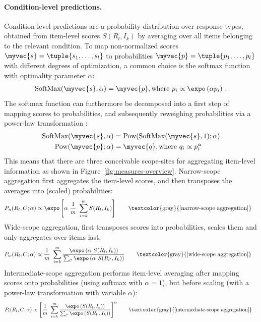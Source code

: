 \documentclass[fleqn]{article}
\begin{document}
\paragraph{Condition-level predictions.}
Condition-level predictions are a probability distribution over response types, obtained from item-level scores $S(R_{l}, I_{k})$ by averaging over all items belonging to the relevant condition.
To map non-normalized scores $\myvec{s} = \tuple{s_{1}, \dots, s_{l}}$ to probabilities $\myvec{p} = \tuple{p_{1}, \dots, p_{l}}$ with different degrees of optimization, a common choice is the softmax function with optimality parameter $\alpha$:
%
\begin{align*}
 \text{SoftMax}(\myvec{s}, \alpha) = \myvec{p}, \text{where } p_{i} \propto \expo \left (\alpha p_{i} \right )\,.
\end{align*}
%
The softmax function can furthermore be decomposed into a first step of mapping scores to probabilities, and subsequently reweighing probabilities via a power-law transformation \citep[c.f.,][]{FrankeDegen2023:The-softmax-fun}:
%
\begin{align*}
  \text{SoftMax}(\myvec{s}, \alpha) & = \text{Pow}( \text{SoftMax}(\myvec{s}, 1) ; \alpha) \\
  \text{Pow}(\myvec{p} ; \alpha) & = \myvec{q}, \text{where } q_{i} \propto p_{i}^{\alpha}
\end{align*}
%
This means that there are three conceivable scope-sites for aggregating item-level information as shown in Figure~\ref{fig:measures-overview}.
Narrow-scope aggregation first aggregates the item-level scores, and then transposes the averages into (scaled) probabilities:
%
\begin{align*}
  & P_{n}(R_{l}, C ; \alpha) \propto \expo \left [  \alpha \ \frac{1}{m} \ \sum_{i = k}^{m} S(R_{l}, I_{k})  \right ]
    \tag*{\textcolor{gray}{[narrow-scope aggregation]}}
\end{align*}
%
Wide-scope aggregation, first transposes scores into probabilities, scales them and only aggregates over items last.
\begin{align*}
  & P_{w}(R_{l}, C ; \alpha) \propto \frac{1}{m} \ \sum_{i = k}^{m} \frac{\expo \left( \alpha \ S(R_{l}, I_{k}) \right )}{ \sum_{l'} \expo \left( \alpha \ S(R_{l'}, I_{k}) \right )}
    \tag*{\textcolor{gray}{[wide-scope aggregation]}}
\end{align*}
%
Intermediate-scope aggregation performs item-level averaging after mapping scores onto probabilities (using softmax with $\alpha=1$), but before scaling (with a power-law transformation with variable $\alpha$):
\begin{align*}
  & P_{i}(R_{l}, C ; \alpha) \propto  \left [ \frac{1}{m} \ \sum_{i = k}^{m} \frac{\expo \left( S(R_{l}, I_{k}) \right )}{ \sum_{l'} \expo \left( S(R_{l'}, I_{k}) \right )} \right ]^{\alpha}
    \tag*{\textcolor{gray}{[intermediate-scope aggregation]}}
\end{align*}
\end{document}
